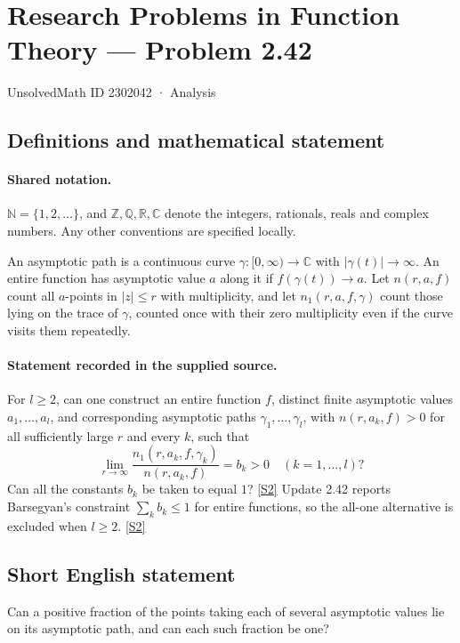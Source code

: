 \documentclass[11pt]{article}
\newcommand{\sref}[2]{\hyperlink{source:#1:#2}{[S#2]}}
\begin{document}
\setcounter{section}{2302041}
\section{Research Problems in Function Theory — Problem 2.42}\label{2302042}
{\small\sffamily UnsolvedMath ID 2302042 · Analysis}
\subsection{Definitions and mathematical statement}

\paragraph{Shared notation.}$\mathbb N=\{1,2,\ldots\}$, and $\mathbb Z,\mathbb Q,\mathbb R,\mathbb C$ denote the integers, rationals, reals and complex numbers. Any other conventions are specified locally.


An asymptotic path is a continuous curve $\gamma:[0,\infty)\to\mathbb C$ with $|\gamma(t)|\to\infty$. An entire function has asymptotic value $a$ along it if $f(\gamma(t))\to a$. Let $n(r,a,f)$ count all $a$-points in $|z|\le r$ with multiplicity, and let $n_1(r,a,f,\gamma)$ count those lying on the trace of $\gamma$, counted once with their zero multiplicity even if the curve visits them repeatedly.

\paragraph{Statement recorded in the supplied source.}
For $l\ge2$, can one construct an entire function $f$, distinct finite asymptotic values $a_1,\ldots,a_l$, and corresponding asymptotic paths $\gamma_1,\ldots,\gamma_l$, with $n(r,a_k,f)>0$ for all sufficiently large $r$ and every $k$, such that
\[\lim_{r\to\infty}\frac{n_1(r,a_k,f,\gamma_k)}{n(r,a_k,f)}=b_k>0
\quad(k=1,\ldots,l)?\]
Can all the constants $b_k$ be taken to equal $1$? \sref{2302042}{2}
Update 2.42 reports Barsegyan's constraint $\sum_k b_k\le1$ for entire functions, so the all-one alternative is excluded when $l\ge2$. \sref{2302042}{2}
\subsection{Short English statement}
Can a positive fraction of the points taking each of several asymptotic values lie on its asymptotic path, and can each such fraction be one?
\end{document}
